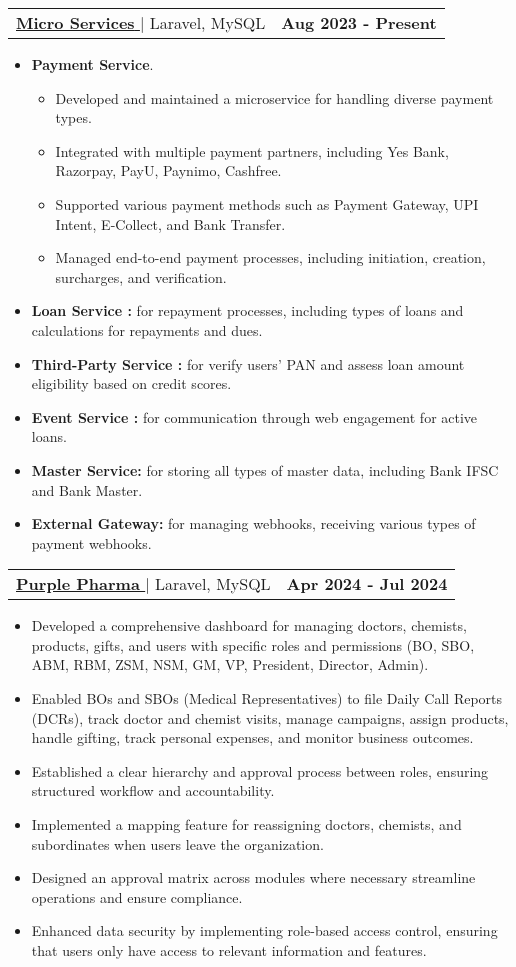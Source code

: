 \documentclass[letterpaper,11pt]{article}
\makeatletter
\newcommand{\resumeItem}[1]{
  \item\small{
    {#1 \vspace{-2pt}}
  }
}
\newcommand{\resumeProjectHeading}[2]{
    \item
    \begin{tabular*}{1.001\textwidth}{l@{\extracolsep{\fill}}r}
      \small#1 & \textbf{\small #2}\\
    \end{tabular*}\vspace{-7pt}
}
\newcommand{\resumeItemListStart}{\begin{itemize}}
\newcommand{\resumeItemListEnd}{\end{itemize}\vspace{-5pt}}
\makeatother
\begin{document}
          
      \resumeProjectHeading
          {\href{}{\textbf{\large{\underline{Micro Services}}} } $|$ \large{Laravel, MySQL}}{Aug 2023 - Present}
          \resumeItemListStart
            \resumeItem{\normalsize{\textbf{Payment Service}.}}
            \resumeItemListStart
                \resumeItem{\normalsize{Developed and maintained a microservice for handling diverse payment types.}}
                \resumeItem{\normalsize{Integrated with multiple payment partners, including Yes Bank, Razorpay, PayU, Paynimo, Cashfree.}}
                \resumeItem{\normalsize{Supported various payment methods such as Payment Gateway, UPI Intent, E-Collect, and Bank Transfer.}}
                \resumeItem{\normalsize{Managed end-to-end payment processes, including initiation, creation, surcharges, and verification.}}
            \resumeItemListEnd
            \resumeItem{\normalsize{\textbf{Loan Service :} for repayment processes, including types of loans and calculations for repayments and dues.}}
            \resumeItem{\normalsize{\textbf{Third-Party Service :} for verify users' PAN and assess loan amount eligibility based on credit scores.}}
            \resumeItem{\normalsize{\textbf{Event Service :} for communication through web engagement for active loans.}}
            \resumeItem{\normalsize{\textbf{Master Service:} for storing all types of master data, including Bank IFSC and Bank Master.}}
            \resumeItem{\normalsize{\textbf{External Gateway:} for managing webhooks, receiving various types of payment webhooks.}}
          \resumeItemListEnd
          \vspace{-13pt}

      \resumeProjectHeading
          {\href{}{\textbf{\large{\underline{Purple Pharma}}} \href{}{\raisebox{-0.1\height}\faExternalLink }} $|$ \large{Laravel, MySQL}}{Apr 2024 - Jul 2024}
          \resumeItemListStart
            \resumeItem{\normalsize{Developed a comprehensive dashboard for managing doctors, chemists, products, gifts, and users with specific roles and permissions (BO, SBO, ABM, RBM, ZSM, NSM, GM, VP, President, Director, Admin).}}
            \resumeItem{\normalsize{Enabled BOs and SBOs (Medical Representatives) to file Daily Call Reports (DCRs), track doctor and chemist visits, manage campaigns, assign products, handle gifting, track personal expenses, and monitor business outcomes.}}
            \resumeItem{\normalsize{Established a clear hierarchy and approval process between roles, ensuring structured workflow and accountability.}}
            \resumeItem{\normalsize{Implemented a mapping feature for reassigning doctors, chemists, and subordinates when users leave the organization.}}
            \resumeItem{\normalsize{Designed an approval matrix across modules where necessary streamline operations and ensure compliance.}}
            \resumeItem{\normalsize{Enhanced data security by implementing role-based access control, ensuring that users only have access to relevant information and features.}}
          \resumeItemListEnd
          \vspace{-13pt}
\end{document}
